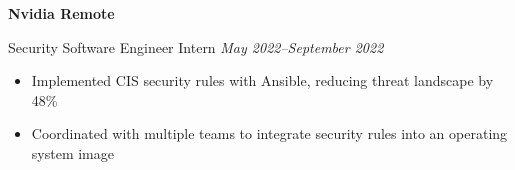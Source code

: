 \textbf{Nvidia \hfill Remote}\par

Security Software Engineer Intern \hfill \textit{May 2022--September 2022}
\begin{itemize}
	\item Implemented CIS security rules with Ansible, reducing threat landscape by 48\%
	\item Coordinated with multiple teams to integrate security rules into an operating system image
\end{itemize}\par
